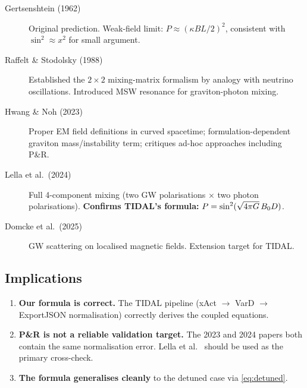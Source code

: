 \begin{description}
  \item[Gertsenshtein (1962)~\cite{gertsenshtein1962wave}] Original prediction. Weak-field limit: $P \approx (\kappa B L/2)^2$, consistent with $\sin^2 \approx x^2$ for small argument.
  \item[Raffelt \& Stodolsky (1988)] Established the $2\times 2$ mixing-matrix formalism by analogy with neutrino oscillations. Introduced MSW resonance for graviton-photon mixing.
  \item[Hwang \& Noh (2023)~\cite{hwangnoh2023graviton}] Proper EM field definitions in curved spacetime; formulation-dependent graviton mass/instability term; critiques ad-hoc approaches including P\&R.
  \item[Lella et al.\ (2024)~\cite{lella2024constraining}] Full 4-component mixing (two GW polarisations $\times$ two photon polarisations). \textbf{Confirms TIDAL's formula:} $P = \sin^2(\sqrt{4\pi G}\,B_0 D)$.
  \item[Domcke et al.\ (2025)~\cite{domcke2025scattering}] GW scattering on localised magnetic fields. Extension target for TIDAL.
\end{description}


\subsection{Implications}

\begin{enumerate}
  \item \textbf{Our formula is correct.} The TIDAL pipeline (xAct $\to$ VarD $\to$ ExportJSON normalisation) correctly derives the coupled equations.
  \item \textbf{P\&R is not a reliable validation target.} The 2023 and 2024 papers both contain the same normalisation error. Lella et al.~\cite{lella2024constraining} should be used as the primary cross-check.
  \item \textbf{The formula generalises cleanly} to the detuned case via \cref{eq:detuned}.
\end{enumerate}
